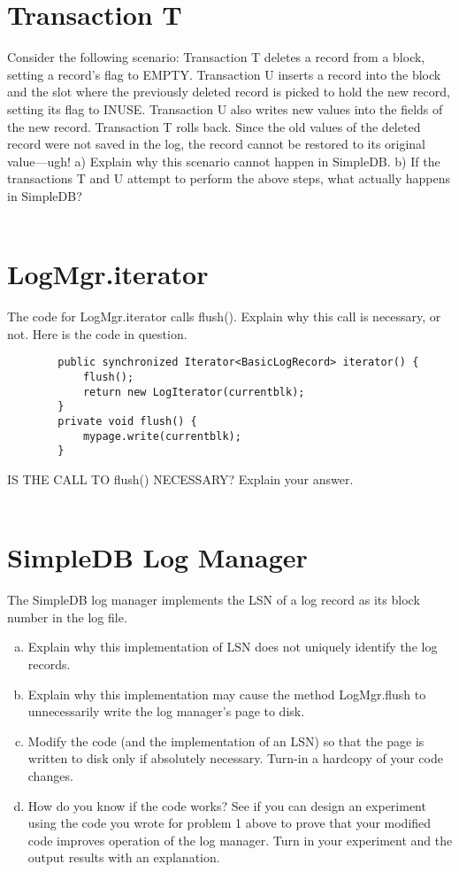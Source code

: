 \documentclass [letter,12pt] {article}
\begin{document}
\section{Transaction T}
    Consider the following scenario: Transaction T deletes a record from a
    block, setting a record’s flag to EMPTY. Transaction U inserts a 
    record into the block and the slot where the previously deleted 
    record is picked to hold the new record, setting its flag to INUSE. 
    Transaction U also writes new values into the fields of the new record. 
    Transaction T rolls back. Since the old values of the deleted record 
    were not saved in the log, the record cannot be restored to its original 
    value—ugh! a) Explain why this scenario cannot happen in SimpleDB. 
    b) If the transactions T and U attempt to perform the above steps, what 
    actually happens in SimpleDB?
    \\
    \\

\section{LogMgr.iterator}
    The code for LogMgr.iterator calls flush(). Explain why this call is 
    necessary, or not. Here is the code in question.

    \begin{verbatim}
        public synchronized Iterator<BasicLogRecord> iterator() {
            flush();
            return new LogIterator(currentblk);
        }
        private void flush() {
            mypage.write(currentblk);
        }
    \end{verbatim}
    IS THE CALL TO flush() NECESSARY? Explain your answer.
    \\
    \\

\section{SimpleDB Log Manager}
    The SimpleDB log manager implements the LSN of a log record as its 
    block number in the log file.

    \begin{enumerate}[(a)]
        \item Explain why this implementation of LSN does not uniquely
            identify the log records.
        \item Explain why this implementation may cause the method 
            LogMgr.flush to unnecessarily write the log manager’s page 
            to disk.
        \item Modify the code (and the implementation of an LSN) so that
            the page is written to disk only if absolutely necessary. 
            Turn-in a hardcopy of your code changes.
        \item How do you know if the code works? See if you can design 
            an experiment using the code you wrote for problem 1 above
            to prove that your modified code improves operation of the 
            log manager. Turn in your experiment and the output results 
            with an explanation.
    \end{enumerate}
\end{document}
